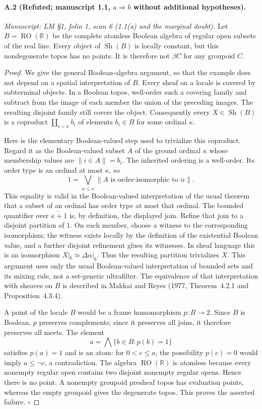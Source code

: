 \paragraph{A.2 (Refuted; manuscript 1.1, $a\Rightarrow b$ without additional hypotheses).}
\textit{Manuscript: LM \S1, folio 1, scan 6 (1.1(a) and the marginal doubt).}
Let $B=\operatorname{RO}(\mathbb R)$ be the complete atomless Boolean algebra of regular open subsets of the real line. Every object of $\operatorname{Sh}(B)$ is locally constant, but this nondegenerate topos has no points. It is therefore not $\beta C$ for any groupoid $C$.
\begin{proof}
We give the general Boolean-algebra argument, so that the example does not depend on a spatial interpretation of $B$. Every sheaf on a locale is covered by subterminal objects. In a Boolean topos, well-order such a covering family and subtract from the image of each member the union of the preceding images. The resulting disjoint family still covers the object. Consequently every $X\in\operatorname{Sh}(B)$ is a coproduct $\coprod_{i<\kappa} b_i$ of elements $b_i\in B$ for some ordinal $\kappa$.

Here is the elementary Boolean-valued step used to trivialize this coproduct. Regard it as the Boolean-valued subset $A$ of the ground ordinal $\kappa$ whose membership values are $\lVert i\in A\rVert=b_i$. The inherited ordering is a well-order. Its order type is an ordinal at most $\kappa$, so
\[
 1=\bigvee_{\alpha\leq\kappa}
       \lVert A\text{ is order-isomorphic to }\check\alpha\rVert.
\]
This equality is valid in the Boolean-valued interpretation of the usual theorem that a subset of an ordinal has order type at most that ordinal. The bounded quantifier over $\check{\kappa+1}$ is, by definition, the displayed join. Refine that join to a disjoint partition of $1$. On each member, choose a witness to the corresponding isomorphism; the witness exists locally by the definition of the existential Boolean value, and a further disjoint refinement glues its witnesses. In sheaf language this is an isomorphism $X|_b\simeq\Delta\alpha|_b$. Thus the resulting partition trivializes $X$. This argument uses only the usual Boolean-valued interpretation of bounded sets and its mixing rule, not a set-generic ultrafilter. The equivalence of that interpretation with sheaves on $B$ is described in Makkai and Reyes (1977, Theorem~4.2.1 and Proposition~4.3.4).

A point of the locale $B$ would be a frame homomorphism $p:B\to2$. Since $B$ is Boolean, $p$ preserves complements; since it preserves all joins, it therefore preserves all meets. The element
\[
 a=\bigwedge\{b\in B:p(b)=1\}
\]
satisfies $p(a)=1$ and is an atom: for $0<c\leq a$, the possibility $p(c)=0$ would imply $a\leq\neg c$, a contradiction. The algebra $\operatorname{RO}(\mathbb R)$ is atomless because every nonempty regular open contains two disjoint nonempty regular opens. Hence there is no point. A nonempty groupoid presheaf topos has evaluation points, whereas the empty groupoid gives the degenerate topos. This proves the asserted failure. \hfill$\square$
\end{proof}

